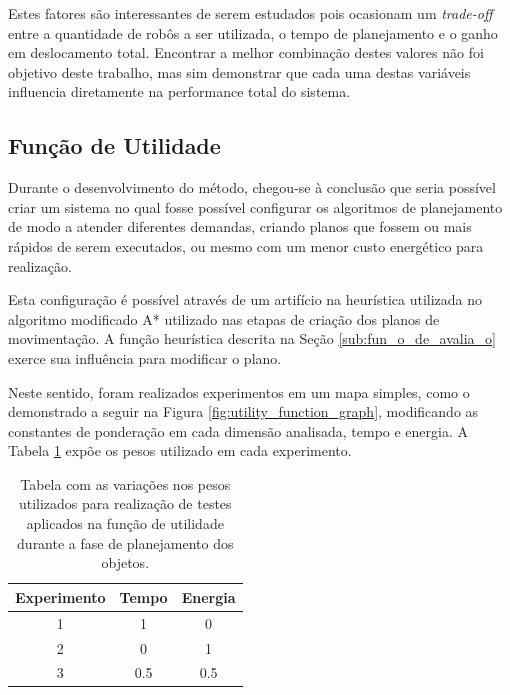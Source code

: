 
Estes fatores são interessantes de serem estudados pois ocasionam um \emph{trade-off} entre a quantidade de robôs a ser utilizada, o tempo de planejamento e o ganho em deslocamento total.
Encontrar a melhor combinação destes valores não foi objetivo deste trabalho, mas sim demonstrar que cada uma destas variáveis influencia diretamente na performance total do sistema.


\subsection{Função de Utilidade} %
\label{sub:fun_o_de_utilidade}

Durante o desenvolvimento do método, chegou-se à conclusão que seria possível criar um sistema no qual fosse possível configurar os algoritmos de planejamento de modo a atender diferentes demandas, criando planos que fossem ou mais rápidos de serem executados, ou mesmo com um menor custo energético para realização.

Esta configuração é possível através de um artifício na heurística utilizada no algoritmo modificado A* utilizado nas etapas de criação dos planos de movimentação.
A função heurística descrita na Seção \ref{sub:fun_o_de_avalia_o} exerce sua influência para modificar o plano.

Neste sentido, foram realizados experimentos em um mapa simples, como o demonstrado a seguir na Figura \ref{fig:utility_function_graph}, modificando as constantes de ponderação em cada dimensão analisada, tempo e energia. A Tabela \ref{table:utility_function_graph} expõe os pesos utilizado em cada experimento.

\begin{table}
    \centering
    \caption[Tabela com as variações nos pesos da função de utilidade]{Tabela com as variações nos pesos utilizados para realização de testes aplicados na função de utilidade durante a fase de planejamento dos objetos.}
    \label{table:utility_function_graph}
    \begin{tabular}{|c|c|c|}
    \hline
    Experimento & Tempo & Energia \\ \hline
    1        & 1     & 0       \\ \hline
    2        & 0     & 1       \\ \hline
    3        & 0.5   & 0.5     \\ \hline
    \end{tabular}
\end{table}

